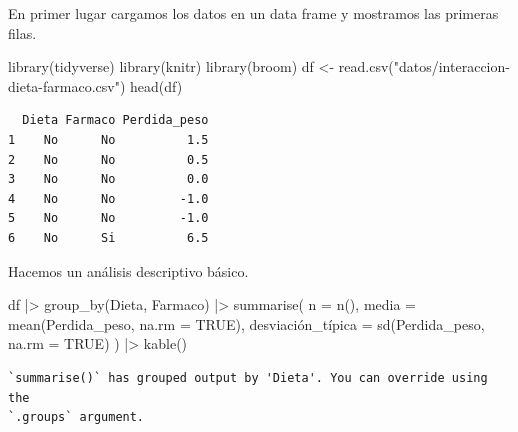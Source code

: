 \documentclass[
  a4paper,
]{scrreport}
\newenvironment{Shaded}{\begin{snugshade}}{\end{snugshade}}
\newcommand{\AttributeTok}[1]{\textcolor[rgb]{0.40,0.45,0.13}{#1}}
\newcommand{\ConstantTok}[1]{\textcolor[rgb]{0.56,0.35,0.01}{#1}}
\newcommand{\FunctionTok}[1]{\textcolor[rgb]{0.28,0.35,0.67}{#1}}
\newcommand{\NormalTok}[1]{\textcolor[rgb]{0.00,0.23,0.31}{#1}}
\newcommand{\OtherTok}[1]{\textcolor[rgb]{0.00,0.23,0.31}{#1}}
\newcommand{\SpecialCharTok}[1]{\textcolor[rgb]{0.37,0.37,0.37}{#1}}
\newcommand{\StringTok}[1]{\textcolor[rgb]{0.13,0.47,0.30}{#1}}
\theoremstyle{definition}
\theoremstyle{remark}
\begin{document}
\begin{tcolorbox}[enhanced jigsaw, breakable, opacityback=0, colbacktitle=quarto-callout-tip-color!10!white, colframe=quarto-callout-tip-color-frame, left=2mm, titlerule=0mm, coltitle=black, colback=white, bottomtitle=1mm, toptitle=1mm, opacitybacktitle=0.6, title=\textcolor{quarto-callout-tip-color}{\faLightbulb}\hspace{0.5em}{Solución}, leftrule=.75mm, bottomrule=.15mm, toprule=.15mm, rightrule=.15mm, arc=.35mm]

En primer lugar cargamos los datos en un data frame y mostramos las
primeras filas.

\begin{Shaded}
\begin{Highlighting}[]
\FunctionTok{library}\NormalTok{(tidyverse)}
\FunctionTok{library}\NormalTok{(knitr)}
\FunctionTok{library}\NormalTok{(broom)}
\NormalTok{df }\OtherTok{\textless{}{-}} \FunctionTok{read.csv}\NormalTok{(}\StringTok{"datos/interaccion{-}dieta{-}farmaco.csv"}\NormalTok{)}
\FunctionTok{head}\NormalTok{(df)}
\end{Highlighting}
\end{Shaded}

\begin{verbatim}
  Dieta Farmaco Perdida_peso
1    No      No          1.5
2    No      No          0.5
3    No      No          0.0
4    No      No         -1.0
5    No      No         -1.0
6    No      Si          6.5
\end{verbatim}

Hacemos un análisis descriptivo básico.

\begin{Shaded}
\begin{Highlighting}[]
\NormalTok{df }\SpecialCharTok{|\textgreater{}} 
    \FunctionTok{group\_by}\NormalTok{(Dieta, Farmaco) }\SpecialCharTok{|\textgreater{}} 
    \FunctionTok{summarise}\NormalTok{(}
        \AttributeTok{n =} \FunctionTok{n}\NormalTok{(),}
        \AttributeTok{media =} \FunctionTok{mean}\NormalTok{(Perdida\_peso, }\AttributeTok{na.rm =} \ConstantTok{TRUE}\NormalTok{),}
\NormalTok{        desviación\_típica }\OtherTok{=} \FunctionTok{sd}\NormalTok{(Perdida\_peso, }\AttributeTok{na.rm =} \ConstantTok{TRUE}\NormalTok{)}
\NormalTok{    ) }\SpecialCharTok{|\textgreater{}} 
    \FunctionTok{kable}\NormalTok{()}
\end{Highlighting}
\end{Shaded}

\begin{verbatim}
`summarise()` has grouped output by 'Dieta'. You can override using the
`.groups` argument.
\end{verbatim}


\end{tcolorbox}
\end{document}

